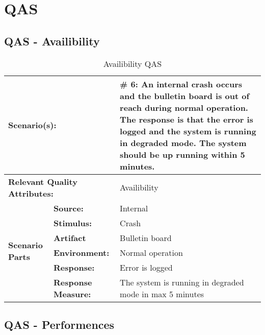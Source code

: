 \chapter{QAS}
\section{QAS - Availibility}
\label{sec:the_remaining_qas:Availibility}

\begin{table}[H]
\begin{center}
\begin{tabular}{|p{0.3cm}|p{2.5cm}|p{8cm}|}
  \hline
  \multicolumn{2}{|p{3cm}|}{\bfseries Scenario(s):} & \#  6: An internal crash occurs and the bulletin board is out of reach during normal operation. The response is that the error is logged and the system is running in degraded mode. The system should be up running within 5 minutes.\\
  \hline
  \multicolumn{2}{|p{3cm}|}{\bfseries Relevant Quality Attributes:} & Availibility\\
  \hline
  \multirow{6}{*}{\begin{sideways}{\bfseries Scenario Parts}\end{sideways}}
  & {\bfseries Source:} & Internal  \\
  \cline{2-3}
  & {\bfseries Stimulus:} & Crash \\
  \cline{2-3}
  & {\bfseries Artifact} &  Bulletin board \\
  \cline{2-3}
  & {\bfseries Environment:} &  Normal operation \\
  \cline{2-3}
  & {\bfseries Response:} &  Error is logged\\
  \cline{2-3}
  & {\bfseries Response Measure:} &  The system is running in degraded mode in max 5 minutes\\
  \hline
\end{tabular}
\caption{Availibility QAS}
\end{center}
\end{table}





\section{QAS - Performences}
\label{sec:the_remaining_qas:Performence}

